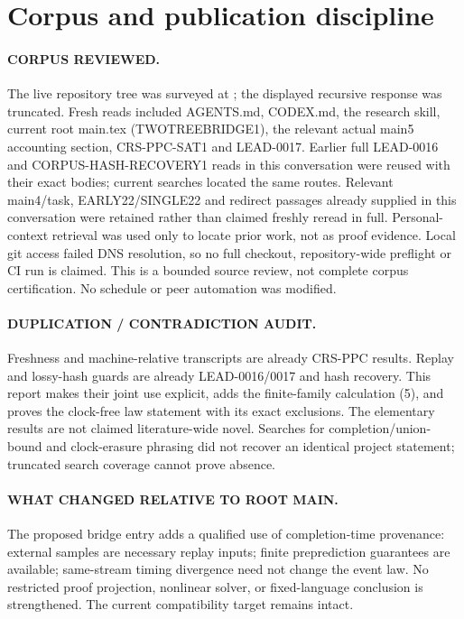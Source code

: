 \documentclass[11pt]{article}
\begin{document}
\section{Corpus and publication discipline}
\paragraph{CORPUS REVIEWED.}
The live repository tree was surveyed at
; the displayed recursive
response was truncated. Fresh reads included AGENTS.md, CODEX.md, the research
skill, current root main.tex (TWOTREEBRIDGE1), the relevant actual main5
accounting section, CRS-PPC-SAT1 and LEAD-0017. Earlier full LEAD-0016 and
CORPUS-HASH-RECOVERY1 reads in this conversation were reused with their exact
bodies; current searches located the same routes. Relevant main4/task,
EARLY22/SINGLE22 and redirect passages already supplied in this conversation
were retained rather than claimed freshly reread in full. Personal-context
retrieval was used only to locate prior work, not as proof evidence.
Local git access failed DNS resolution, so no full checkout, repository-wide
preflight or CI run is claimed. This is a bounded source review, not complete
corpus certification. No schedule or peer automation was modified.

\paragraph{DUPLICATION / CONTRADICTION AUDIT.}
Freshness and machine-relative transcripts are already CRS-PPC results.
Replay and lossy-hash guards are already LEAD-0016/0017 and hash recovery.
This report makes their joint use explicit, adds the finite-family calculation
(5), and proves the clock-free law statement with its exact exclusions.
The elementary results are not claimed literature-wide novel. Searches for
completion/union-bound and clock-erasure phrasing did not recover an identical
project statement; truncated search coverage cannot prove absence.

\paragraph{WHAT CHANGED RELATIVE TO ROOT MAIN.}
The proposed bridge entry adds a qualified use of completion-time provenance:
external samples are necessary replay inputs; finite preprediction guarantees
are available; same-stream timing divergence need not change the event law.
No restricted proof projection, nonlinear solver, or fixed-language conclusion
is strengthened. The current compatibility target remains intact.
\end{document}
